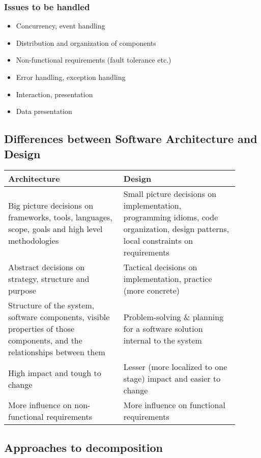 \documentclass{article}
\begin{document}
\subsubsection{Issues to be handled}
\begin{itemize}
    \item Concurrency, event handling
    
    \item Distribution and organization of components
    
    \item Non-functional requirements (fault tolerance etc.)
    
    \item Error handling, exception handling
    
    \item Interaction, presentation
    
    \item Data presentation
\end{itemize}
\subsection{Differences between Software Architecture and Design}
\begin{tabular}{|p{0.45\linewidth}|p{0.45\linewidth}|}
    \hline
    \textbf{Architecture} &  \textbf{Design} \\
    \hline
    Big picture decisions on frameworks, tools, languages, scope, goals and high level methodologies & Small picture decisions on implementation, programming idioms, code organization, design patterns, local constraints on requirements \\
    \hline
    Abstract decisions on strategy, structure and purpose & Tactical decisions on implementation, practice (more concrete) \\
    \hline
    Structure of the system, software components, visible properties of those components, and the relationships between them & Problem-solving \& planning for a software solution internal to the system \\
    \hline
    High impact and tough to change & Lesser (more localized to one stage) impact and easier to change \\
    \hline 
    More influence on non-functional requirements & More influence on functional requirements \\
    \hline
\end{tabular}

\subsection{Approaches to decomposition}
\end{document}
